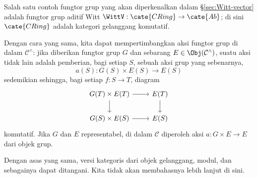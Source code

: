 Salah satu contoh fungtor grup yang akan diperkenalkan dalam \S\ref{sec:Witt-vector} adalah fungtor grup aditif Witt $\WittV: \cate{CRing} \to \cate{Ab}$; di sini $\cate{CRing}$ adalah kategori gelanggang komutatif.

\begin{remark}
	Dengan cara yang sama, kita dapat mempertimbangkan aksi fungtor grup di dalam $\mathcal{C}^\wedge$: jika diberikan fungtor grup $G$ dan sebarang $E \in \Obj(\mathcal{C}^\wedge)$, suatu aksi tidak lain adalah pemberian, bagi setiap $S$, sebuah aksi grup yang sebenarnya,
	\[ a(S): G(S) \times E(S) \to E(S) \]
	sedemikian sehingga, bagi setiap $f: S \to T$, diagram
	\[ \begin{tikzcd}
		G(T) \times E(T) \arrow[d] \arrow[r] & E(T) \arrow[d] \\
		G(S) \times E(S) \arrow[r] & E(S)
	\end{tikzcd} \]
	komutatif. Jika $G$ dan $E$ representabel, di dalam $\mathcal{C}$ diperoleh aksi $a: G \times E \to E$ dari objek grup.
\end{remark}
Dengan asas yang sama, versi kategoris dari objek gelanggang, modul, dan sebagainya dapat ditangani. Kita tidak akan membahasnya lebih lanjut di sini.

